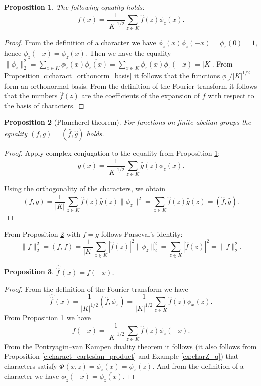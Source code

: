 \documentclass[11pt]{article}
\newtheorem{claim}{Proposition}[section]
\theoremstyle{definition}
\begin{document}
{{{\begin{claim}\label{c:fourier_basis}  The following equality holds:
\[f(x)=\frac{1}{|K|^{1/2}}\sum\limits_{z\in K} \widehat{f}(z)\phi_z(x). \]
\end{claim}
\begin{proof}
From the definition of a character we have $\phi_z(x)\phi_z(-x)=\phi_z(0)=1$, hence $\phi_z(-x)=\overline{\phi_z(x)}$.
Then we have the equality $\|\phi_z\|_2^2=\sum_{x\in K}\phi_z(x)\overline{\phi_z(x)} =\sum_{x\in K}\phi_z(x){\phi_z(-x)}=|K|$. From Proposition \ref{c:charact_orthonorm_basis} it follows that the functions $\phi_z/|K|^{1/2}$ form an orthonormal basis. From the definition of the Fourier transform it follows that the numbers $\widehat{f}(z)$ are the coefficients of the expansion of $f$ with respect to the basis of characters.
\end{proof}



\begin{claim}[Plancherel theorem]\label{c:plansh}
For functions on finite abelian groups the equality $(f,g)=(\widehat{f},\widehat{g})$ holds.
\end{claim}
\begin{proof}
Apply complex conjugation to the equality from Proposition \ref{c:fourier_basis}:
\[\overline{g(x)}=\frac{1}{|K|^{1/2}}\sum\limits_{z\in K}\overline{ \widehat{g}(z)\phi_z(x)}. \]

Using the orthogonality of the characters, we obtain
$$(f,g)=\frac{1}{|K|}\sum\limits_{z\in K}
\widehat{f}(z)\overline{\widehat{g}(z)}\|\phi_z\|^2=\sum\limits_{z\in
K}
\widehat{f}(z)\overline{\widehat{g}(z)}=(\widehat{f},\widehat{g}).$$
\end{proof}


From Proposition \ref{c:plansh} with $f=g$ follows Parseval's identity:
    \[\|f\|_2^2=(f,f)=\frac{1}{|K|}\sum\limits_{z\in
 K}|\widehat{f}(z)|^2 \|\phi_z\|_2^2=\sum\limits_{z\in
 K}|\widehat{f}(z)|^2=\|\widehat{f}\|_2^2. \]


\begin{claim} \label{c:double fourier}
    $\widehat{\widehat{f}\,}(x)=f(-x)$.
\end{claim}
\begin{proof}
From the definition of the Fourier transform we have
\[\widehat{\widehat{f}\,}(x)=\frac{1}{|K|^{1/2}}(\widehat{f},\phi_x)=
 \frac{1}{|K|^{1/2}}\sum\limits_{z\in
 K}\widehat{f}(z)\overline{\phi_x(z)}.\]
From Proposition \ref{c:fourier_basis} we have
\[f(-x)=\frac{1}{|K|^{1/2}}\sum\limits_{z\in
 K} \widehat{f}(z)\phi_z(-x). \]
From the Pontryagin–van Kampen duality theorem it follows   (it  also follows from Proposition  \ref{c:charact_cartesian_product} and Example \ref{ex:charZ_q})  that characters satisfy
$\Phi(x,z)=\phi_z(x)=\phi_x(z)$. And from the definition of a character we have $\phi_z(-x)=\overline{\phi_z(x)}$.
\end{proof}

}}}
\end{document}
